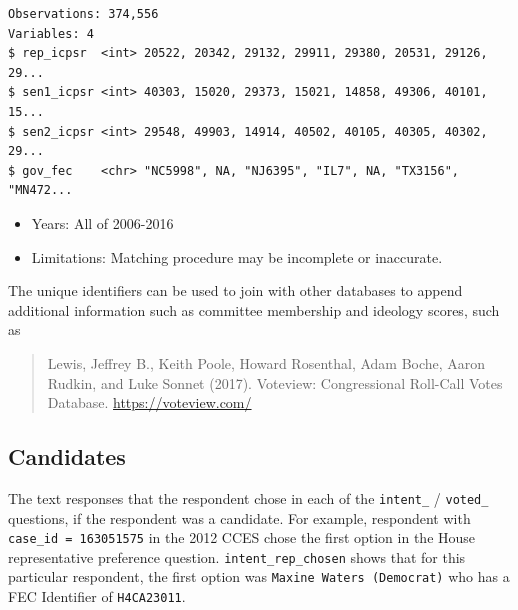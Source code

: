 \documentclass[10pt,article,oneside]{memoir}
\theoremstyle{definition}
\newenvironment{Shaded}{\begin{snugshade}}{\end{snugshade}}
\newcommand{\KeywordTok}[1]{\textcolor[rgb]{0.13,0.29,0.53}{\textbf{#1}}}
\newcommand{\DecValTok}[1]{\textcolor[rgb]{0.00,0.00,0.81}{#1}}
\newcommand{\StringTok}[1]{\textcolor[rgb]{0.31,0.60,0.02}{#1}}
\newcommand{\OperatorTok}[1]{\textcolor[rgb]{0.81,0.36,0.00}{\textbf{#1}}}
\newcommand{\NormalTok}[1]{#1}
\begin{document}
\begin{verbatim}
Observations: 374,556
Variables: 4
$ rep_icpsr  <int> 20522, 20342, 29132, 29911, 29380, 20531, 29126, 29...
$ sen1_icpsr <int> 40303, 15020, 29373, 15021, 14858, 49306, 40101, 15...
$ sen2_icpsr <int> 29548, 49903, 14914, 40502, 40105, 40305, 40302, 29...
$ gov_fec    <chr> "NC5998", NA, "NJ6395", "IL7", NA, "TX3156", "MN472...
\end{verbatim}

\begin{itemize}
\tightlist
\item
  Years: All of 2006-2016
\item
  Limitations: Matching procedure may be incomplete or inaccurate.
\end{itemize}

The unique identifiers can be used to join with other databases to
append additional information such as committee membership and ideology
scores, such as

\begin{quote}
Lewis, Jeffrey B., Keith Poole, Howard Rosenthal, Adam Boche, Aaron
Rudkin, and Luke Sonnet (2017). Voteview: Congressional Roll-Call Votes
Database. \url{https://voteview.com/}
\end{quote}

\subsection{Candidates}\label{candidates}

The text responses that the respondent chose in each of the
\texttt{intent\_} / \texttt{voted\_} questions, if the respondent was a
candidate. For example, respondent with \texttt{case\_id\ =\ 163051575}
in the 2012 CCES chose the first option in the House representative
preference question. \texttt{intent\_rep\_chosen} shows that for this
particular respondent, the first option was
\texttt{Maxine\ Waters\ (Democrat)} who has a FEC Identifier of
\texttt{H4CA23011}.

\begin{Shaded}
\end{Shaded}
\end{document}

